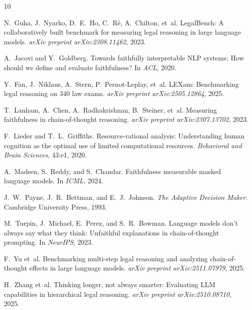 \documentclass[11pt]{article}
\begin{document}

\begin{thebibliography}{10}

N.~Guha, J.~Nyarko, D.~E.~Ho, C.~R\'{e}, A.~Chilton, et~al.
\newblock LegalBench: A collaboratively built benchmark for measuring legal reasoning in large language models.
\newblock \emph{arXiv preprint arXiv:2308.11462}, 2023.

A.~Jacovi and Y.~Goldberg.
\newblock Towards faithfully interpretable NLP systems: How should we define and evaluate faithfulness?
\newblock In \emph{ACL}, 2020.

Y.~Fan, J.~Niklaus, A.~Stern, P.~Pernot-Leplay, et~al.
\newblock LEXam: Benchmarking legal reasoning on 340 law exams.
\newblock \emph{arXiv preprint arXiv:2505.12864}, 2025.

T.~Lanham, A.~Chen, A.~Radhakrishnan, B.~Steiner, et~al.
\newblock Measuring faithfulness in chain-of-thought reasoning.
\newblock \emph{arXiv preprint arXiv:2307.13702}, 2023.

F.~Lieder and T.~L.~Griffiths.
\newblock Resource-rational analysis: Understanding human cognition as the optimal use of limited computational resources.
\newblock \emph{Behavioral and Brain Sciences}, 43:e1, 2020.

A.~Madsen, S.~Reddy, and S.~Chandar.
\newblock Faithfulness measurable masked language models.
\newblock In \emph{ICML}, 2024.

J.~W.~Payne, J.~R.~Bettman, and E.~J.~Johnson.
\newblock \emph{The Adaptive Decision Maker}.
\newblock Cambridge University Press, 1993.

M.~Turpin, J.~Michael, E.~Perez, and S.~R.~Bowman.
\newblock Language models don't always say what they think: Unfaithful explanations in chain-of-thought prompting.
\newblock In \emph{NeurIPS}, 2023.

F.~Yu et~al.
\newblock Benchmarking multi-step legal reasoning and analyzing chain-of-thought effects in large language models.
\newblock \emph{arXiv preprint arXiv:2511.07979}, 2025.

H.~Zhang et~al.
\newblock Thinking longer, not always smarter: Evaluating LLM capabilities in hierarchical legal reasoning.
\newblock \emph{arXiv preprint arXiv:2510.08710}, 2025.


\end{thebibliography}
\end{document}
